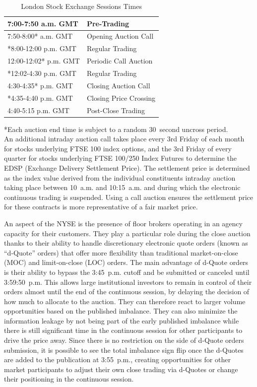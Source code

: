 	\begin{table}[!ht]
  	\centering
   	\caption{London Stock Exchange Sessions Times\label{tab:LSEclose}}
   	\begin{tabular}{ll} 
	7:00-7:50 a.m. GMT & Pre-Trading  \\ \hline
	7:50-8:00* a.m. GMT & Opening Auction Call\\ \hline
	*8:00-12:00 p.m. GMT & Regular Trading \\ \hline
	12:00-12:02* p.m. GMT & Periodic Call Auction \\ \hline
	*12:02-4:30 p.m. GMT & Regular Trading \\ \hline
	4:30-4:35* p.m. GMT & Closing Auction Call \\ \hline
	*4:35-4:40 p.m. GMT & Closing Price Crossing \\ \hline	
	4:40-5:15 p.m. GMT & Post-Close Trading
   	\end{tabular}
	\begin{minipage}[t]{1\textwidth}
	\small{*Each auction end time is subject to a random 30~second uncross period.\\}
	\small{An additional intraday auction call takes place every 3rd Friday of each month for stocks underlying FTSE 100 index options, and the 3rd Friday of every quarter for stocks underlying FTSE 100/250 Index Futures to determine the EDSP (Exchange Delivery Settlement Price). The settlement price is determined as the index value derived from the individual constituents intraday auction taking place between 10~a.m. and 10:15~a.m. and during which the electronic continuous trading is suspended. Using a call auction ensures the settlement price for these contracts is more representative of a fair market price.}
	\end{minipage}   
	\end{table}	

An aspect of the NYSE is the presence of floor brokers operating in an agency capacity for their customers. They play a particular role during the close auction thanks to their ability to handle discretionary electronic quote orders (known as ``d-Quote'' orders) that offer more flexibility than traditional market-on-close (MOC) and limit-on-close (LOC) orders. The main advantage of d-Quote orders is their ability to bypass the 3:45~p.m. cutoff and be submitted or canceled until 3:59:50~p.m. This allows large institutional investors to remain in control of their orders almost until the end of the continuous session, by delaying the decision of how much to allocate to the auction. They can therefore react to larger volume opportunities based on the published imbalance. They can also minimize the information leakage by not being part of the early published imbalance while there is still significant time in the continuous session for other participants to drive the price away.  Since there is no restriction on the side of d-Quote orders submission, it is possible to see the total imbalance sign flip once the d-Quotes are added to the publication at 3:55~p.m., creating opportunities for other market participants to adjust their own close trading via d-Quotes or change their positioning in the continuous session. \label{in:fund_trade2} \label{in:close3}



